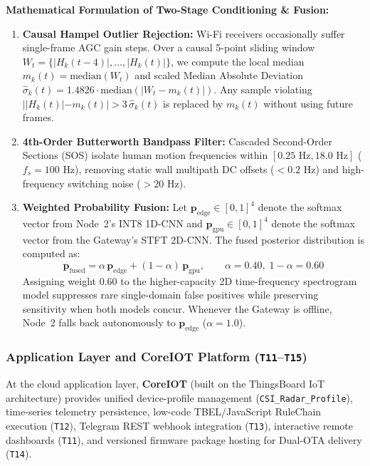 \documentclass{hcmut-report}
\begin{document}
\textbf{Mathematical Formulation of Two-Stage Conditioning \& Fusion:}
\begin{enumerate}
  \item \textbf{Causal Hampel Outlier Rejection:} Wi-Fi receivers occasionally suffer single-frame AGC gain steps. Over a causal 5-point sliding window $W_t = \{|H_k(t-4)|,\dots,|H_k(t)|\}$, we compute the local median $m_k(t) = \text{median}(W_t)$ and scaled Median Absolute Deviation $\hat{\sigma}_k(t) = 1.4826 \cdot \text{median}(|W_t - m_k(t)|)$. Any sample violating $||H_k(t)| - m_k(t)| > 3\,\hat{\sigma}_k(t)$ is replaced by $m_k(t)$ without using future frames.
  \item \textbf{4th-Order Butterworth Bandpass Filter:} Cascaded Second-Order Sections (SOS) isolate human motion frequencies within $[0.25\text{ Hz}, 18.0\text{ Hz}]$ ($f_s = 100\text{ Hz}$), removing static wall multipath DC offsets ($<0.2\text{ Hz}$) and high-frequency switching noise ($>20\text{ Hz}$).
  \item \textbf{Weighted Probability Fusion:} Let $\mathbf{p}_{\text{edge}} \in [0,1]^4$ denote the softmax vector from Node~2's INT8 1D-CNN and $\mathbf{p}_{\text{gpu}} \in [0,1]^4$ denote the softmax vector from the Gateway's STFT 2D-CNN. The fused posterior distribution is computed as:
  \begin{equation}
    \mathbf{p}_{\text{fused}} = \alpha\,\mathbf{p}_{\text{edge}} + (1 - \alpha)\,\mathbf{p}_{\text{gpu}}, \qquad \alpha = 0.40,\; 1-\alpha = 0.60
    \label{eq:prob_fusion}
  \end{equation}
  Assigning weight $0.60$ to the higher-capacity 2D time-frequency spectrogram model suppresses rare single-domain false positives while preserving sensitivity when both models concur. Whenever the Gateway is offline, Node~2 falls back autonomously to $\mathbf{p}_{\text{edge}}$ ($\alpha = 1.0$).
\end{enumerate}

\subsubsection{Application Layer and CoreIOT Platform (\texttt{T11}--\texttt{T15})}
\label{sec:app_layer}

At the cloud application layer, \textbf{CoreIOT} (built on the ThingsBoard IoT architecture) provides unified device-profile management (\texttt{CSI\_Radar\_Profile}), time-series telemetry persistence, low-code TBEL/JavaScript RuleChain execution (\texttt{T12}), Telegram REST webhook integration (\texttt{T13}), interactive remote dashboards (\texttt{T11}), and versioned firmware package hosting for Dual-OTA delivery (\texttt{T14}).
\end{document}
